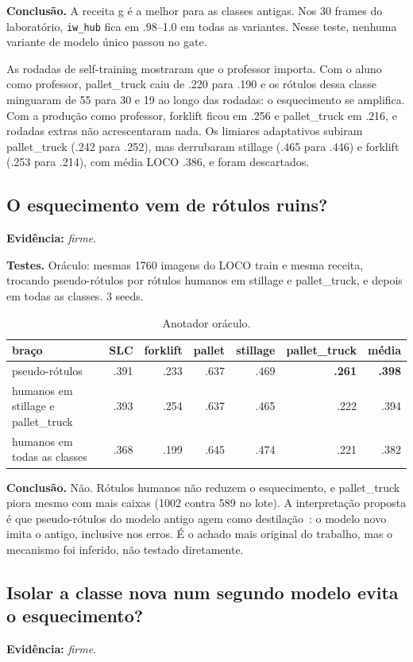 \documentclass[11pt,a4paper]{article}
\newcommand{\evidencia}[1]{\noindent\textbf{Evidência:} \emph{#1}.\par}
\newcommand{\testes}{\noindent\textbf{Testes.} }
\newcommand{\conclusao}{\noindent\textbf{Conclusão.} }
\begin{document}
\conclusao A receita g é a melhor para as classes antigas. Nos 30 frames do
laboratório, \texttt{iw\_hub} fica em .98--1.0 em todas as variantes. Nesse
teste, nenhuma variante de modelo único passou no gate.

As rodadas de self-training mostraram que o professor importa. Com o aluno como
professor, pallet\_truck caiu de .220 para .190 e os rótulos dessa classe
minguaram de 55 para 30 e 19 ao longo das rodadas: o esquecimento se amplifica.
Com a produção como professor, forklift ficou em .256 e pallet\_truck em .216,
e rodadas extras não acrescentaram nada. Os limiares adaptativos subiram
pallet\_truck (.242 para .252), mas derrubaram stillage (.465 para .446) e
forklift (.253 para .214), com média LOCO .386, e foram descartados.

\subsection{O esquecimento vem de rótulos ruins?}
\label{q:oraculo}
\evidencia{firme}

\testes Oráculo: mesmas 1760 imagens do LOCO train e mesma receita, trocando
pseudo-rótulos por rótulos humanos em stillage e pallet\_truck, e depois em todas
as classes. 3 seeds.

\begin{table}[H]
\centering\small
\caption{Anotador oráculo.}
\begin{tabular}{lrrrrrr}
\toprule
braço & SLC & forklift & pallet & stillage & pallet\_truck & média \\
\midrule
pseudo-rótulos & .391 & .233 & .637 & .469 & \textbf{.261} & \textbf{.398} \\
humanos em stillage e pallet\_truck & .393 & .254 & .637 & .465 & .222 & .394 \\
humanos em todas as classes & .368 & .199 & .645 & .474 & .221 & .382 \\
\bottomrule
\end{tabular}
\end{table}

\conclusao Não. Rótulos humanos não reduzem o esquecimento, e pallet\_truck
piora mesmo com mais caixas (1002 contra 589 no lote). A interpretação proposta
é que pseudo-rótulos do modelo antigo agem como destilação~\cite{hinton}: o
modelo novo imita o antigo, inclusive nos erros. É o achado mais original do
trabalho, mas o mecanismo foi inferido, não testado diretamente.

\subsection{Isolar a classe nova num segundo modelo evita o esquecimento?}
\evidencia{firme}
\end{document}
